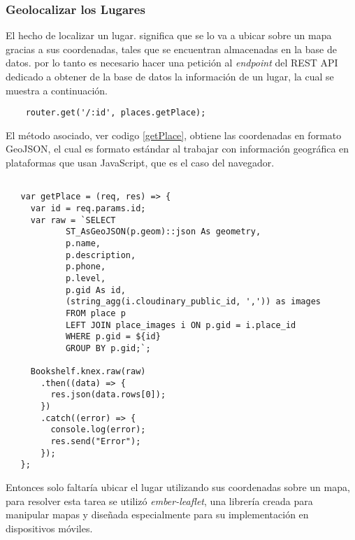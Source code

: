 

\subsubsection{Geolocalizar los Lugares}
\label{sub:fronted_lugares}

El hecho de localizar un lugar. significa que se lo va a ubicar sobre un mapa gracias a sus coordenadas, tales que se encuentran almacenadas en la base de datos. por lo tanto es necesario hacer una petición al \emph{endpoint} del REST API dedicado a obtener de la base de datos la información de un lugar, la cual se muestra a continuación. \\

\begin{center}
  \begin{verbatim}
    router.get('/:id', places.getPlace);
  \end{verbatim}
\end{center}

El método asociado, ver codigo \ref{getPlace}, obtiene las coordenadas en formato GeoJSON, el cual es formato estándar al trabajar con información geográfica en plataformas que usan JavaScript, que es el caso del navegador. \\

\begin{center}
 \begin{lstlisting}[label=getPlace,caption=Método para obtener la información de un lugar.]

   var getPlace = (req, res) => {
     var id = req.params.id;
     var raw = `SELECT
            ST_AsGeoJSON(p.geom)::json As geometry,
            p.name,
            p.description,
            p.phone,
            p.level,
            p.gid As id,
            (string_agg(i.cloudinary_public_id, ',')) as images
            FROM place p
            LEFT JOIN place_images i ON p.gid = i.place_id
            WHERE p.gid = ${id}
            GROUP BY p.gid;`;

     Bookshelf.knex.raw(raw)
       .then((data) => {
         res.json(data.rows[0]);
       })
       .catch((error) => {
         console.log(error);
         res.send("Error");
       });
   };

 \end{lstlisting}
\end{center}


Entonces solo faltaría ubicar el lugar utilizando sus coordenadas sobre un mapa, para resolver esta tarea se utilizó \emph{ember-leaflet}, una librería creada para manipular mapas y diseñada especialmente  para su implementación en dispositivos móviles.\\

